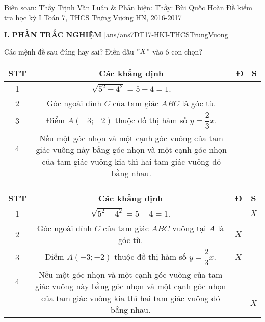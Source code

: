 
	\begin{name}
		{Biên soạn: Thầy Trịnh Văn Luân \& Phản biện: Thầy: Bùi Quốc Hoàn}
		{Đề kiểm tra học kỳ I Toán 7, THCS Trưng Vương HN, 2016-2017}
	\end{name}
	\noindent\textbf{I. PHẦN TRẮC NGHIỆM}
	\setcounter{ex}{0}
	[ans/ans7DT17-HKI-THCSTrungVuong]
		\begin{ex}%
	Các mệnh đề sau đúng hay sai? Điền dấu $"X"$ vào ô con chọn?\\
\begin{tabular}{|c|c|c|c|}
	\hline 
	STT & Các khẳng định & Đ & S\\ 
	\hline 
	1 & $\sqrt{5^2- 4^2}= 5- 4= 1$. &  & \\ 
	\hline 
	2 & Góc ngoài đỉnh $C$ của tam giác $ABC$ là góc tù. &  & \\
	\hline
	3 & Điểm $A(-3; -2)$ thuộc đồ thị hàm số $y= \dfrac{2}{3}x.$  &  & \\
	\hline
	4 & \multirow{3}{33em}{Nếu một góc nhọn và một cạnh góc vuông của tam giác vuông này bằng góc nhọn và một cạnh góc nhọn của tam giác vuông kia thì hai tam giác vuông đó bằng nhau.} &  & \\
	& & &\\
	& & &\\
\hline
\end{tabular}
			\loigiai
			{
				\begin{center}
\begin{tabular}{|c|c|c|c|}
	\hline 
	STT & Các khẳng định & Đ & S\\ 
	\hline 
	1 & $\sqrt{5^2- 4^2}= 5- 4= 1$. &  & $X$\\ 
	\hline 
	2 & Góc ngoài đỉnh $C$ của tam giác $ABC$ vuông tại $A$ là góc tù. & $X$ & \\
	\hline
	3 & Điểm $A(-3; -2)$ thuộc đồ thị hàm số $y= \dfrac{2}{3}x.$  & $X$  & \\
	\hline
	4 & \multirow{3}{33em}{Nếu một góc nhọn và một cạnh góc vuông của tam giác vuông này bằng góc nhọn và một cạnh góc nhọn của tam giác vuông kia thì hai tam giác vuông đó bằng nhau.} &  & \\
	& & &$X$\\
	& & &\\
	\hline
\end{tabular}				
\end{center}			}
		\end{ex}
